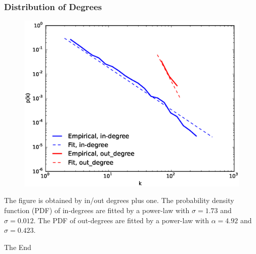 \documentclass{beamer}
\begin{document}
\begin{frame}
\frametitle{Distribution of Degrees}
\begin{figure}
\includegraphics[width=0.65\linewidth]{degreepdf.eps}
\end{figure}
\small{The figure is obtained by in/out degrees plus one. The probability density function (PDF) of in-degrees are fitted by a power-law with $\sigma=1.73$ and $\sigma=0.012$. The PDF of out-degrees are fitted by a power-law with $\alpha=4.92$ and $\sigma=0.423$.}
\end{frame}


\begin{frame}
\Huge{\centerline{The End}}
\end{frame}

\end{document}
